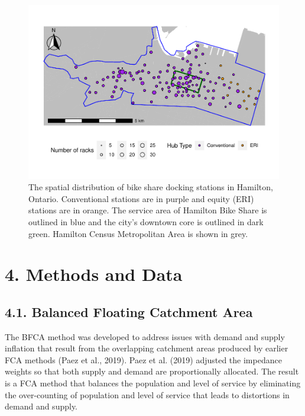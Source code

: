 \documentclass[]{elsarticle} %
\begin{document}
\begin{figure}

{\centering \includegraphics[width=1\linewidth]{Bike-share-spatial-equity-R1_files/figure-latex/sobi-stations-in-hamilton-1} 

}

\caption{The spatial distribution of bike share docking stations in Hamilton, Ontario. Conventional stations are in purple and equity (ERI) stations are in orange. The service area of Hamilton Bike Share is outlined in blue and the city's downtown core is outlined in dark green. Hamilton Census Metropolitan Area is shown in grey.}\label{fig:sobi-stations-in-hamilton}
\end{figure}

\hypertarget{sec:methods}{%
\section{4. Methods and Data}\label{sec:methods}}

\hypertarget{balanced-floating-catchment-area}{%
\subsection{4.1. Balanced Floating Catchment
Area}\label{balanced-floating-catchment-area}}

The BFCA method was developed to address issues with demand and supply
inflation that result from the overlapping catchment areas produced by
earlier FCA methods (Paez et al., 2019). Paez et al. (2019) adjusted the
impedance weights so that both supply and demand are proportionally
allocated. The result is a FCA method that balances the population and
level of service by eliminating the over-counting of population and
level of service that leads to distortions in demand and supply.
\end{document}
